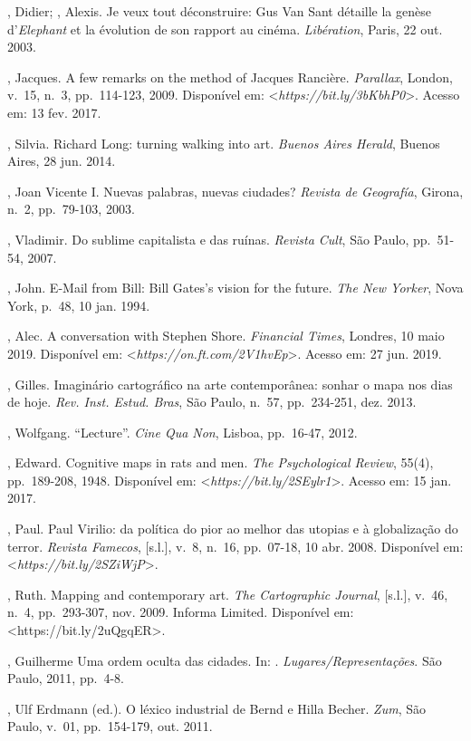 \begin{Parskip}
, Didier; , Alexis. Je veux tout déconstruire: Gus Van Sant
détaille la genèse d'\emph{Elephant} et la évolution de son rapport au
cinéma. \emph{Libération}, Paris, 22 out. 2003.

, Jacques. A few remarks on the method of Jacques Rancière.
\emph{Parallax}, London, v.~15, n.~3, pp.~114-123, 2009. Disponível em:
\textless{}\emph{https://bit.ly/3bKbhP0}\textgreater{}. Acesso em: 13 fev. 2017.

, Silvia. Richard Long: turning walking into art.
\emph{Buenos Aires Herald}, Buenos Aires, 28 jun. 2014.

, Joan Vicente I. Nuevas palabras, nuevas ciudades? \emph{Revista
de Geografía}, Girona, n.~2, pp.~79-103, 2003. %

, Vladimir. Do sublime capitalista e das ruínas. \emph{Revista
Cult}, São Paulo, pp.~51-54, 2007.

, John. E-Mail from Bill: Bill Gates's vision for the future.
\emph{The New Yorker}, Nova York, p.~48, 10 jan. 1994.

, Alec. A conversation with Stephen Shore. \emph{Financial Times},
Londres, 10 maio 2019. Disponível em:
\textless{}\emph{https://on.ft.com/2V1hvEp}\textgreater{}.
Acesso em: 27 jun. 2019.

, Gilles. Imaginário cartográfico na arte contemporânea:
sonhar o mapa nos dias de hoje. \emph{Rev. Inst. Estud. Bras}, São
Paulo, n.~57, pp.~234-251, dez. 2013.

, Wolfgang. ``Lecture''. \emph{Cine Qua Non}, Lisboa, pp.~16-47,
2012.

, Edward. Cognitive maps in rats and men. \emph{The Psychological Review}, 55(4), pp.~189-208, 1948. Disponível em:
\textless{}\emph{https://bit.ly/2SEylr1}\textgreater{}.
Acesso em: 15 jan. 2017.

, Paul. Paul Virilio: da política do pior ao melhor das utopias e
à globalização do terror. \emph{Revista Famecos}, {[}s.l.{]}, v.~8, n.~16, pp.~07-18, 10 abr. 2008. Disponível em: \textless{}\emph{https://bit.ly/2SZiWjP}\textgreater{}.

, Ruth. Mapping and contemporary art. \emph{The Cartographic
Journal}, {[}s.l.{]}, v.~46, n.~4, pp.~293-307, nov. 2009. Informa 
Limited. Disponível em: \textless{}{https://bit.ly/2uQgqER}\textgreater{}. %

, Guilherme Uma ordem oculta das cidades. In: .
\emph{Lugares/Representações}. São Paulo, 2011, pp.~4-8.

, Ulf Erdmann (ed.). O léxico industrial de Bernd e Hilla Becher.
\emph{Zum}, São Paulo, v.~01, pp.~154-179, out. 2011.
\end{Parskip}

